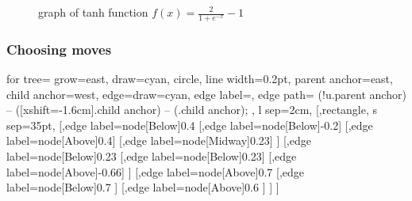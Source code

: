 \documentclass{beamer}
\begin{document}
	\begin{frame}

		\begin{figure}
				\centering
			
				\caption{graph of tanh function $f(x)={\frac{2}{1+e^{-x}}- 1}$ \label{sigmoid}}
		\end{figure}
	\end{frame}



	\begin{frame}
		\frametitle{Choosing moves}

		\begin{forest} 
			for tree={
				grow=east,
				draw=cyan,
				circle,
				line width=0.2pt,
				parent anchor=east,
				child anchor=west,
				edge={draw=cyan},
				edge label={\Huge\color{black}},
				edge path={
					\noexpand{}
						(!u.parent anchor) -- ([xshift=-1.6cm].child anchor) --    
						(.child anchor)\forestoption{edge label};
				},
				l sep=2cm,
			} 
			[,rectangle, s sep=35pt,
				[,edge label={node[Below]{0.4}}
					[,edge label={node[Below]{-0.2}}]
					[,edge label={node[Above]{0.4}}]
					[,edge label={node[Midway]{0.23}}]
				]
				[,edge label={node[Below]{0.23}}
					[,edge label={node[Below]{0.23}}]
					[,edge label={node[Above]{-0.66}}]
				]
				[,edge label={node[Above]{0.7}}
					[,edge label={node[Below]{0.7}}
					]
					[,edge label={node[Above]{0.6}}
					]
				]
			]
			\end{forest}
	\end{frame}
\end{document}

